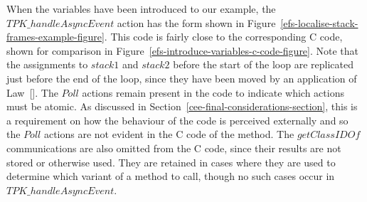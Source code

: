 When the variables have been introduced to our example, the
$TPK\_handleAsyncEvent$ action has the form shown in
Figure~\ref{efs-localise-stack-frames-example-figure}.
This code is fairly close to the corresponding C code, shown for
comparison in Figure~\ref{efs-introduce-variables-c-code-figure}.
Note that the assignments to $stack1$ and $stack2$ before the start of
the loop are replicated just before the end of the loop, since they
have been moved by an application of
Law~[].
The $Poll$ actions remain present in the \Circus{} code to indicate
which actions must be atomic.
As discussed in Section~\ref{cee-final-considerations-section}, this
is a requirement on how the behaviour of the code is perceived
externally and so the $Poll$ actions are not evident in the C code of
the method.
The $getClassIDOf$ communications are also omitted from the C code,
since their results are not stored or otherwise used. 
They are retained in cases where they are used to determine which
variant of a method to call, though no such cases occur in
$TPK\_handleAsyncEvent$.

